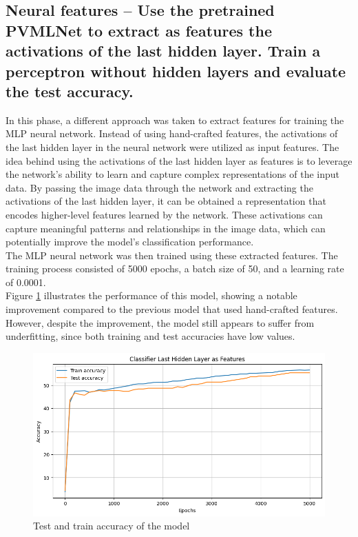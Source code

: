 \documentclass{class}
\begin{document}
\subsection{Neural features -- Use the pretrained PVMLNet to extract as features the activations of the last hidden
    layer. Train a perceptron without hidden layers and evaluate the test accuracy.}
In this phase, a different approach was taken to extract features for training the MLP neural network.
Instead of using hand-crafted features, the activations of the last hidden layer in the neural network were utilized as input features.
The idea behind using the activations of the last hidden layer as features is to leverage the network's ability to learn
and capture complex representations of the input data.
By passing the image data through the network and extracting the activations of the last hidden layer,
it can be obtained a representation that encodes higher-level features learned by the network.
These activations can capture meaningful patterns and relationships in the image data, which can potentially improve the model's classification performance.\\
The MLP neural network was then trained using these extracted features.
The training process consisted of 5000 epochs, a batch size of 50, and a learning rate of 0.0001.\\
Figure \ref{fig-2} illustrates the performance of this model, showing a notable improvement compared
to the previous model that used hand-crafted features.
However, despite the improvement, the model still appears to suffer from underfitting, since both training and test accuracies have low values.
\begin{figure}[h]
    \centering
    \includegraphics[width=\columnwidth]{images/1.2_last_hidden_layer.png}
    \caption{Test and train accuracy of the model}
    \label{fig-2}
\end{figure}
\end{document}
